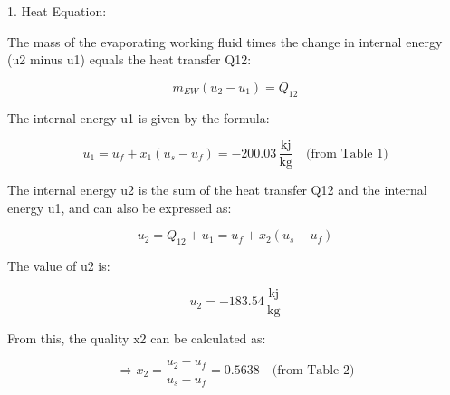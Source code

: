 1. Heat Equation:

The mass of the evaporating working fluid times the change in internal energy (u2 minus u1) equals the heat transfer Q12:

\[ m_{EW} (u_2 - u_1) = Q_{12} \]

The internal energy u1 is given by the formula:

\[ u_1 = u_f + x_1 (u_s - u_f) = -200.03 \, \frac{\text{kj}}{\text{kg}} \quad \text{(from Table 1)} \]

The internal energy u2 is the sum of the heat transfer Q12 and the internal energy u1, and can also be expressed as:

\[ u_2 = Q_{12} + u_1 = u_f + x_2 (u_s - u_f) \]

The value of u2 is:

\[ u_2 = -183.54 \, \frac{\text{kj}}{\text{kg}} \]

From this, the quality x2 can be calculated as:

\[ \Rightarrow x_2 = \frac{u_2 - u_f}{u_s - u_f} = 0.5638 \quad \text{(from Table 2)} \]